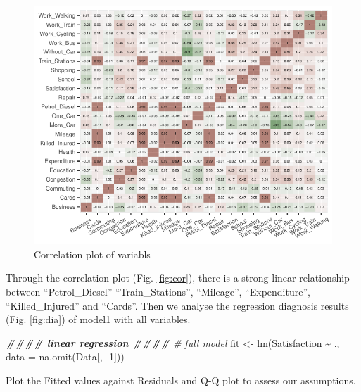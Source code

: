 \documentclass[
]{article}
\newenvironment{Shaded}{\begin{snugshade}}{\end{snugshade}}
\newcommand{\AttributeTok}[1]{\textcolor[rgb]{0.77,0.63,0.00}{#1}}
\newcommand{\CommentTok}[1]{\textcolor[rgb]{0.56,0.35,0.01}{\textit{#1}}}
\newcommand{\DecValTok}[1]{\textcolor[rgb]{0.00,0.00,0.81}{#1}}
\newcommand{\DocumentationTok}[1]{\textcolor[rgb]{0.56,0.35,0.01}{\textbf{\textit{#1}}}}
\newcommand{\FunctionTok}[1]{\textcolor[rgb]{0.00,0.00,0.00}{#1}}
\newcommand{\NormalTok}[1]{#1}
\newcommand{\OtherTok}[1]{\textcolor[rgb]{0.56,0.35,0.01}{#1}}
\newcommand{\SpecialCharTok}[1]{\textcolor[rgb]{0.00,0.00,0.00}{#1}}
\begin{document}
\begin{figure}[H]

{\centering \includegraphics{RMD-Group-28_files/figure-latex/unnamed-chunk-5-1} 

}

\caption{\label{fig:cor} Correlation plot of variabls}\label{fig:unnamed-chunk-5}
\end{figure}

Through the correlation plot (Fig. \ref{fig:cor}), there is a strong
linear relationship between ``Petrol\_Diesel'' ``Train\_Stations'',
``Mileage'', ``Expenditure'', ``Killed\_Injured'' and ``Cards''. Then we
analyse the regression diagnosis results (Fig. \ref{fig:dia}) of model1
with all variables.

\begin{Shaded}
\begin{Highlighting}[]
\DocumentationTok{\#\#\#\# linear regression \#\#\#\#}
\CommentTok{\# full model}
\NormalTok{fit }\OtherTok{\textless{}{-}} \FunctionTok{lm}\NormalTok{(Satisfaction }\SpecialCharTok{\textasciitilde{}}\NormalTok{ ., }\AttributeTok{data =} \FunctionTok{na.omit}\NormalTok{(Data[, }\SpecialCharTok{{-}}\DecValTok{1}\NormalTok{]))}
\end{Highlighting}
\end{Shaded}

Plot the Fitted values against Residuals and Q-Q plot to assess our
assumptions.
\end{document}
